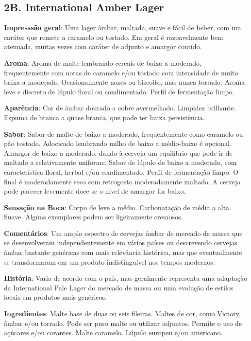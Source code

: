 \subsection*{2B. International Amber Lager}
\textbf{Impresssão geral}: Uma lager âmbar, maltada, suave e fácil de beber, com um caráter que remete a caramelo ou tostado. Em geral é razoavelmente bem atenuada, muitas vezes com caráter de adjunto e amargor contido.

\textbf{Aroma}: Aroma de malte lembrando cereais de baixo a moderado, frequentemente com notas de caramelo e/ou tostado com intensidade de muito baixa a moderada. Ocasionalmente nozes ou biscoito, mas nunca torrado. Aroma leve e discreto de lúpulo floral ou condimentado. Perfil de fermentação limpo.

\textbf{Aparência}: Cor de âmbar dourado a cobre avermelhado. Limpidez brilhante. Espuma de branca a quase branca, que pode ter baixa persistência.

\textbf{Sabor}: Sabor de malte de baixo a moderado, frequentemente como caramelo ou pão tostado. Adocicado lembrando milho de baixo a médio-baixo é opcional. Amargor de baixo a moderado, dando à cerveja um equilíbrio que pode ir de maltado a relativamente uniforme. Sabor de lúpulo de baixo a moderado, com característica floral, herbal e/ou condimentado. Perfil de fermentação limpo. O final é moderadamente seco com retrogosto moderadamente maltado. A cerveja pode parecer levemente doce se o nível de amargor for baixo.

\textbf{Sensação na Boca}: Corpo de leve a médio. Carbonatação de média a alta. Suave. Alguns exemplares podem ser ligeiramente cremosos.

\textbf{Comentários}: Um amplo espectro de cervejas âmbar de mercado de massa que se desenvolveram independentemente em vários países ou descrevendo cervejas âmbar bastante genéricas com mais relevância histórica, mas que eventualmente se transformaram em um produto indistinguível nos tempos modernos.

\textbf{História}: Varia de acordo com o país, mas geralmente representa uma adaptação da International Pale Lager do mercado de massa ou uma evolução de estilos locais em produtos mais genéricos.

\textbf{Ingredientes}: Malte base de duas ou seis fileiras. Maltes de cor, como Victory, âmbar e/ou torrado. Pode ser puro malte ou utilizar adjuntos. Permite o uso de açúcares e/ou corantes. Malte caramelo. Lúpulo europeu e/ou americano.

